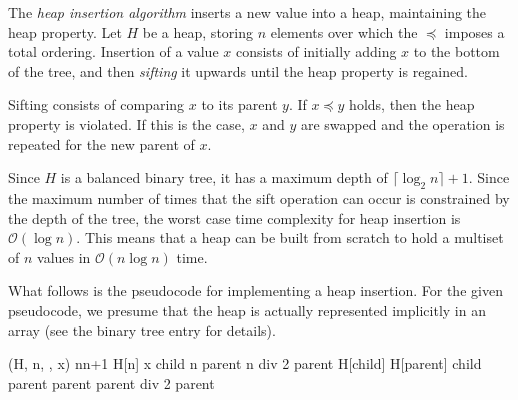 \documentclass[12pt]{article}
\begin{document}
The \emph{heap insertion algorithm} inserts a new value into a heap, maintaining the heap property.  Let $H$ be a heap, storing $n$ elements over which the  $\preceq$ imposes a total ordering.  Insertion of a value $x$ consists of initially adding $x$ to the bottom of the tree, and then \emph{sifting} it upwards until the heap property is regained.

Sifting consists of comparing $x$ to its parent $y$.  If $x \preceq y$ holds, then the heap property is violated.  If this is the case, $x$ and $y$ are swapped and the operation is repeated for the new parent of $x$.

Since $H$ is a balanced binary tree, it has a maximum depth of $\lceil\log_2n\rceil+1$.  Since the maximum number of times that the sift operation can occur is constrained by the depth of the tree, the worst case time complexity for heap insertion is $\mathcal{O}(\log n)$.
This means that a heap can be built from scratch to hold a multiset of $n$ values in $\mathcal{O}(n\log n)$ time.

What follows is the pseudocode for implementing a heap insertion.
For the given pseudocode, we presume that the heap is actually represented implicitly in an array (see the binary tree entry for details).

\begin{program}
(H, n, \preceq, x)
n\gets n+1
H[n] \gets x
child \gets n
parent \gets n \textrm{ div } 2
\WHILE parent  \DO
  \IF H[child] \preceq H[parent]
  \THEN child \gets parent
        parent \gets parent \textrm{ div } 2
  \ELSE parent 
  \FI
\OD
\end{program}

\end{document}
